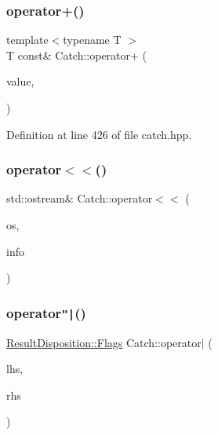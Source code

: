 \hypertarget{namespace_catch_a5e95b3c47a7618db3649dc39b0bb9004}{}\label{namespace_catch_a5e95b3c47a7618db3649dc39b0bb9004} 
\subsubsection{\texorpdfstring{operator+()}{operator+()}}
{\footnotesize\ttfamily template$<$typename T $>$ \\
T const\& Catch\+::operator+ (\begin{DoxyParamCaption}\item[{T const \&}]{value,  }\item[{\hyperlink{struct_catch_1_1_stream_end_stop}{Stream\+End\+Stop}}]{ }\end{DoxyParamCaption})}



Definition at line 426 of file catch.\+hpp.

\hypertarget{namespace_catch_a6ec18b5054d7fdfdde861c580b082995}{}\label{namespace_catch_a6ec18b5054d7fdfdde861c580b082995} 
\subsubsection{\texorpdfstring{operator$<$$<$()}{operator<<()}}
{\footnotesize\ttfamily std\+::ostream\& Catch\+::operator$<$$<$ (\begin{DoxyParamCaption}\item[{std\+::ostream \&}]{os,  }\item[{\hyperlink{struct_catch_1_1_source_line_info}{Source\+Line\+Info} const \&}]{info }\end{DoxyParamCaption})}

\hypertarget{namespace_catch_ab32a083e442cc09f736327d2e2865999}{}\label{namespace_catch_ab32a083e442cc09f736327d2e2865999} 
\subsubsection{\texorpdfstring{operator\texttt{"|}()}{operator|()}}
{\footnotesize\ttfamily \hyperlink{struct_catch_1_1_result_disposition_a3396cad6e2259af326b3aae93e23e9d8}{Result\+Disposition\+::\+Flags} Catch\+::operator$\vert$ (\begin{DoxyParamCaption}\item[{\hyperlink{struct_catch_1_1_result_disposition_a3396cad6e2259af326b3aae93e23e9d8}{Result\+Disposition\+::\+Flags}}]{lhs,  }\item[{\hyperlink{struct_catch_1_1_result_disposition_a3396cad6e2259af326b3aae93e23e9d8}{Result\+Disposition\+::\+Flags}}]{rhs }\end{DoxyParamCaption})\hspace{0.3cm}{\ttfamily [inline]}}



